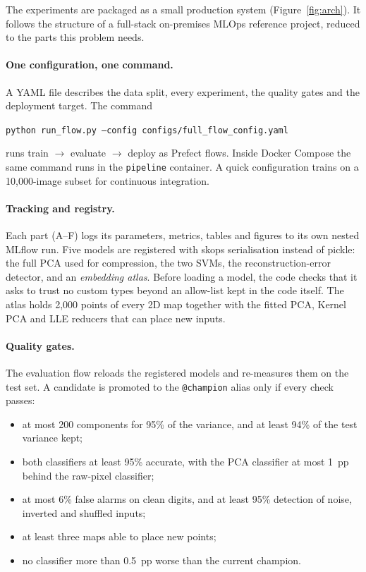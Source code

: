 \documentclass[11pt,a4paper]{article}
\begin{document}
The experiments are packaged as a small production system (Figure~\ref{fig:arch}). It follows the structure of a full-stack on-premises MLOps reference project, reduced to the parts this problem needs.

\paragraph{One configuration, one command.} A YAML file describes the data split, every experiment, the quality gates and the deployment target. The command
\begin{center}\texttt{python run\_flow.py --config configs/full\_flow\_config.yaml}\end{center}
runs train $\to$ evaluate $\to$ deploy as Prefect flows. Inside Docker Compose the same command runs in the \texttt{pipeline} container. A quick configuration trains on a 10{,}000-image subset for continuous integration.

\paragraph{Tracking and registry.} Each part (A--F) logs its parameters, metrics, tables and figures to its own nested MLflow run. Five models are registered with skops serialisation instead of pickle: the full PCA used for compression, the two SVMs, the reconstruction-error detector, and an \emph{embedding atlas}. Before loading a model, the code checks that it asks to trust no custom types beyond an allow-list kept in the code itself. The atlas holds 2{,}000 points of every 2D map together with the fitted PCA, Kernel PCA and LLE reducers that can place new inputs.

\paragraph{Quality gates.} The evaluation flow reloads the registered models and re-measures them on the test set. A candidate is promoted to the \texttt{@champion} alias only if every check passes:
\begin{itemize}
\item at most 200 components for 95\% of the variance, and at least 94\% of the test variance kept;
\item both classifiers at least 95\% accurate, with the PCA classifier at most 1~pp behind the raw-pixel classifier;
\item at most 6\% false alarms on clean digits, and at least 95\% detection of noise, inverted and shuffled inputs;
\item at least three maps able to place new points;
\item no classifier more than 0.5~pp worse than the current champion.
\end{itemize}
\end{document}

